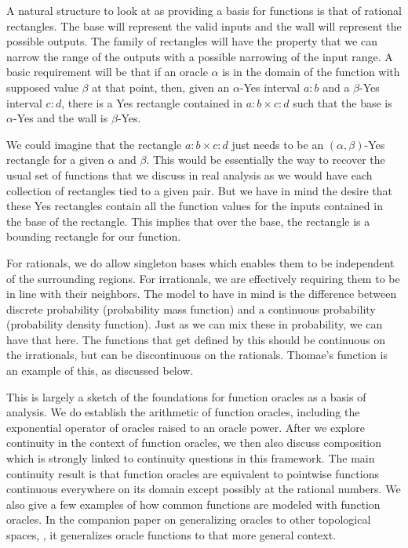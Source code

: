 \documentclass[12pt]{article}
\begin{document}
A natural structure to look at as providing a basis for functions is that of rational rectangles. The base will represent the valid inputs and the wall will represent the possible outputs. The family of rectangles will have the property that we can narrow the range of the outputs with a possible narrowing of the input range. A basic requirement will be that if an oracle $\alpha$ is in the domain of the function with supposed value $\beta$ at that point, then, given an $\alpha$-Yes interval $a:b$ and a $\beta$-Yes interval $c:d$, there is a Yes rectangle contained in $a:b \times c:d$ such that the base is $\alpha$-Yes and the wall is $\beta$-Yes. 

We could imagine that the rectangle $a:b \times c:d$ just needs to be an $(\alpha, \beta)$-Yes rectangle for a given $\alpha$ and $\beta$. This would be essentially the way to recover the usual set of functions that we discuss in real analysis as we would have each collection of rectangles tied to a given pair. But we have in mind the desire that these Yes rectangles contain all the function values for the inputs contained in the base of the rectangle. This implies that over the base, the rectangle is a bounding rectangle for our function. 

For rationals, we do allow singleton bases which enables them to be independent of the surrounding regions. For irrationals, we are effectively requiring them to be in line with their neighbors. The model to have in mind is the difference between discrete probability (probability mass function) and a continuous probability (probability density function). Just as we can mix these in probability, we can have that here. The functions that get defined by this should be continuous on the irrationals, but can be discontinuous on the rationals. Thomae's function is an example of this, as discussed below. 

This is largely a sketch of the foundations for function oracles as a basis of analysis. We do establish the arithmetic of function oracles, including the exponential operator of oracles raised to an oracle power. After we explore continuity in the context of function oracles, we then also discuss composition which is strongly linked to continuity questions in this framework. The main continuity result is that function oracles are equivalent to pointwise functions continuous everywhere on its domain except possibly at the rational numbers. We also give a few examples of how common functions are modeled with function oracles. In the companion paper on generalizing oracles to other topological spaces, \cite{taylor23metric}, it generalizes oracle functions to that more general context. 
\end{document}
